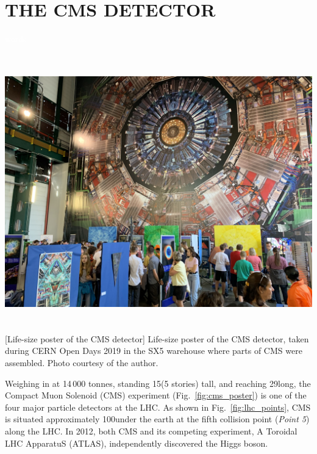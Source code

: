 \chapter{THE CMS DETECTOR} 
\label{ch:cms}
\textcolor{white}{words}  %
\begin{multiFigure}
    \centering
    \includegraphics[height=12cm]{figures/cms/cms_poster_SX5.jpg}
        [Life-size poster of the CMS detector]
        {Life-size poster of the CMS detector, taken during CERN Open Days 2019 in the SX5 warehouse where parts of CMS were assembled.
        Photo courtesy of the author.}
    \label{fig:cms_poster}
\end{multiFigure}
Weighing in at 14\,000 tonnes, standing 15\meter (5 stories) tall, and reaching 29\meter long, the Compact Muon Solenoid (CMS) experiment (Fig.~\ref{fig:cms_poster}) is one of 
the four major particle detectors at the LHC.
As shown in Fig.~\ref{fig:lhc_points}, CMS is situated approximately 100\meter under the earth at the fifth collision point (\emph{Point 5}) along the LHC.
In 2012, both CMS and its competing experiment, A Toroidal LHC ApparatuS (ATLAS), independently discovered the Higgs boson.
